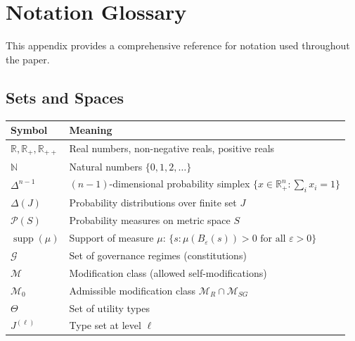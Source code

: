 \documentclass[12pt]{article}
\newcommand{\R}{\mathbb{R}}
\newcommand{\N}{\mathbb{N}}
\DeclareMathOperator{\supp}{supp}
\begin{document}
\appendix



\appendix

\section{Notation Glossary}
\label{app:notation}

This appendix provides a comprehensive reference for notation used throughout the paper.

\subsection{Sets and Spaces}

\begin{tabular}{ll}
\toprule
\textbf{Symbol} & \textbf{Meaning} \\
\midrule
$\R, \R_+, \R_{++}$ & Real numbers, non-negative reals, positive reals \\
$\N$ & Natural numbers $\{0, 1, 2, \ldots\}$ \\
$\Delta^{n-1}$ & $(n-1)$-dimensional probability simplex $\{x \in \R^n_+ : \sum_i x_i = 1\}$ \\
$\Delta(J)$ & Probability distributions over finite set $J$ \\
$\mathcal{P}(S)$ & Probability measures on metric space $S$ \\
$\supp(\mu)$ & Support of measure $\mu$: $\{s : \mu(B_\varepsilon(s)) > 0 \text{ for all } \varepsilon > 0\}$ \\
$\mathcal{G}$ & Set of governance regimes (constitutions) \\
$\mathcal{M}$ & Modification class (allowed self-modifications) \\
$\mathcal{M}_0$ & Admissible modification class $\mathcal{M}_R \cap \mathcal{M}_{SG}$ \\
$\Theta$ & Set of utility types \\
$J^{(\ell)}$ & Type set at level $\ell$ \\
\bottomrule
\end{tabular}
\end{document}
